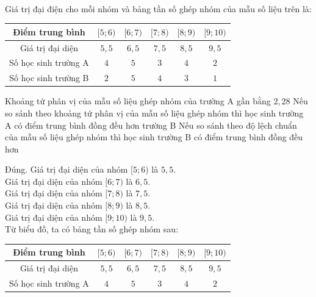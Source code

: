 \begin{ex}
\\
	\choiceTF
	{\True
		Giá trị đại điện cho mỗi nhóm và bảng tần số ghép nhóm của mẫu số liệu trên là:\\
		\begin{tabular}{|c|c|c|c|c|c|}
			\hline
			Điểm trung bình & $[5;6)$  & $[6;7)$  & $[7;8)$  & $[8;9)$  & $[9;10)$   \\
			\hline
			Giá trị đại diện & $5{,}5$  & $6{,}5$ & $7{,}5$ & $8{,}5$  & $9{,}5$  \\
			\hline
			Số học sinh trường A & $4$  & $5$ & $3$ & $4$  & $2$  \\
			\hline
			Số học sinh trường B & $2$  & $5$ & $4$ & $3$  & $1$  \\
			\hline
		\end{tabular}
	}
	{\True Khoảng tứ phân vị của mẫu số liệu ghép nhóm của trường A gần bằng $2{,}28$}
	{ Nếu so sánh theo khoảng tứ phân vị của mẫu số liệu ghép nhóm thì học sinh trường A có điểm trung bình đồng đều hơn trường B}
	{\True Nếu so sánh theo độ lệch chuẩn của mẫu số liệu ghép nhóm thì học sinh trường B có điểm trung bình đồng đều hơn}
	\loigiai
	{
		\begin{itemchoice}
			\itemch Đúng. Giá trị đại diện của nhóm $[5; 6)$ là $5{,}5$.\\
			Giá trị đại diện của nhóm $[6; 7)$ là $6{,}5$.\\
			Giá trị đại diện của nhóm $[7; 8)$ là $7{,}5$.\\
			Giá trị đại diện của nhóm $[8; 9)$ là $8{,}5$.\\
			Giá trị đại diện của nhóm $[9; 10)$ là $9{,}5$.\\
			Từ biểu đồ, ta có bảng tần số ghép nhóm sau:\\
			\begin{tabular}{|c|c|c|c|c|c|}
				\hline
				Điểm trung bình & $[5;6)$  & $[6;7)$  & $[7;8)$  & $[8;9)$  & $[9;10)$   \\
				\hline
				Giá trị đại diện & $5{,}5$  & $6{,}5$ & $7{,}5$ & $8{,}5$  & $9{,}5$  \\
				\hline
				Số học sinh trường A & $4$  & $5$ & $3$ & $4$  & $2$  \\

\end{tabular}
\end{itemchoice}}
\end{ex}
